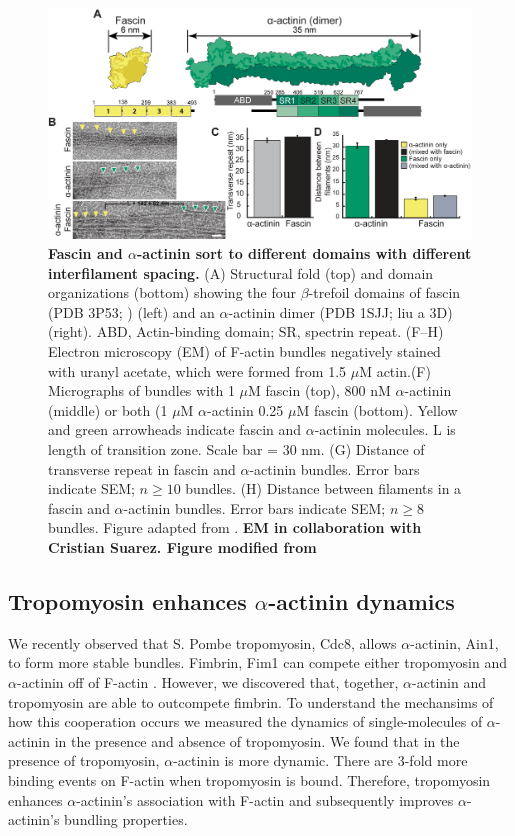 \begin{figure}
\centering
\includegraphics[width=14cm]{img/ch03/Thesis_EM_fig.png}
\caption[Fascin and \texorpdfstring{$\alpha$}{alpha}-actinin sort to different domains with different interfilament spacing.]{\textbf{Fascin and $\alpha$-actinin sort to different domains with different interfilament spacing.} (A) Structural fold (top) and domain organizations (bottom) showing the four $\beta$-trefoil domains of fascin (PDB 3P53; \citep{jansen_mechanism_2011}) (left) and an $\alpha$-actinin dimer (PDB 1SJJ; {liu a 3D}) (right). ABD, Actin-binding domain; SR, spectrin repeat. (F–H) Electron microscopy (EM) of F-actin bundles negatively stained with uranyl acetate, which were formed from 1.5 $\mu$M actin.(F) Micrographs of bundles with 1 $\mu$M fascin (top), 800 nM $\alpha$-actinin (middle) or both (1 $\mu$M $\alpha$-actinin 0.25 $\mu$M fascin (bottom). Yellow and green arrowheads indicate fascin and $\alpha$-actinin molecules. L is length of transition zone. Scale bar = 30 nm. (G) Distance of transverse repeat in fascin and $\alpha$-actinin bundles. Error bars indicate SEM; $n\geq10$ bundles. (H) Distance between filaments in a fascin and $\alpha$-actinin bundles. Error bars indicate SEM; $n\geq8$ bundles. Figure adapted from \citep{winkelman_fascin-_2016}. \textbf{EM in collaboration with Cristian Suarez. Figure modified from \citep{winkelman_fascin-_2016}}}
\label{fig:em_fascin_aact}
\end{figure}

\subsection{Tropomyosin enhances \texorpdfstring{$\alpha$}{a}-actinin dynamics}
We recently observed that S. Pombe tropomyosin, Cdc8, allows $\alpha$-actinin, Ain1, to form more stable bundles. Fimbrin, Fim1 can compete either tropomyosin and $\alpha$-actinin off of F-actin \citep{christensen_competition_2017}. However, we discovered that, together, $\alpha$-actinin and tropomyosin are able to outcompete fimbrin. To understand the mechansims of how this cooperation occurs we measured the dynamics of single-molecules of $\alpha$-actinin in the presence and absence of tropomyosin. We found that in the presence of tropomyosin, $\alpha$-actinin is more dynamic. There are 3-fold more binding events on F-actin when tropomyosin is bound. Therefore, tropomyosin enhances $\alpha$-actinin's association with F-actin and subsequently improves $\alpha$-actinin's bundling properties. 

